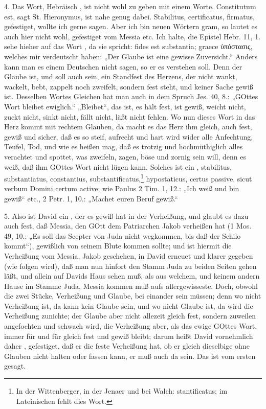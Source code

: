 4. Das Wort, Hebräisch , ist nicht wohl zu geben mit einem Worte. Constitutum est, sagt St. Hieronymus, ist nahe genug dabei. Stabilitus, certificatus, firmatus, gefestiget, wollte ich gerne sagen. Aber ich bin neuen Wörtern gram, so lautet es auch hier nicht wohl, gefestiget vom Messia etc. Ich halte, die Epistel Hebr. 11, 1. sehe hieher auf das Wort , da sie spricht: fides est substantia; graece ὑπόστασις, welches mir verdeutscht haben: „Der Glaube ist eine gewisse Zuversicht.“ Anders kann man es einem Deutschen nicht sagen, so er es verstehen soll. Denn der Glaube ist, und soll auch sein, ein Standfest des Herzens, der nicht wankt, wackelt, bebt, zappelt noch zweifelt, sondern fest steht, und keiner Sache gewiß ist. Desselben Wortes Gleichen hat man auch in dem Spruch Jes. 40, 8.: „GOttes Wort bleibet ewiglich.“ „Bleibet“, das ist, es hält fest, ist gewiß, weicht nicht, zuckt nicht, sinkt nicht, fällt nicht, läßt nicht fehlen. Wo nun dieses Wort in das Herz kommt mit rechtem Glauben, da macht es das Herz ihm gleich, auch fest, gewiß und sicher, daß es so steif, aufrecht und hart wird wider alle Anfechtung, Teufel, Tod, und wie es heißen mag, daß es trotzig und hochmüthiglich alles verachtet und spottet, was zweifeln, zagen, böse und zornig sein will, denn es weiß, daß ihm GOttes Wort nicht lügen kann. Solches ist ein , stabilitus, substantiatus, constantius, substantificatus,\footnote{In der Wittenberger, in der Jenaer und bei Walch: stantificatus; im Lateinischen fehlt dies Wort.} hypostaticus, certus passive. sicut verbum Domini certum active; wie Paulus 2 Tim. 1, 12.: „Ich weiß und bin gewiß“ etc., 2 Petr. 1, 10.: „Machet euren Beruf gewiß.“

5. Also ist David ein , der es gewiß hat in der Verheißung, und glaubt es dazu auch fest, daß Messia, den GOtt dem Patriarchen Jakob verheißen hat (1 Mos. 49, 10.: „Es soll das Scepter von Juda nicht wegkommen, bis daß der Schilo kommt“), gewißlich von seinem Blute kommen sollte; und ist hiermit die Verheißung vom Messia, Jakob geschehen, in David erneuet und klarer gegeben (wie folgen wird), daß man nun hinfort den Stamm Juda zu beiden Seiten gehen läßt, und allein auf Davids Haus sehen muß, als aus welchem, und keinem andern Hause im Stamme Juda, Messia kommen muß aufs allergewisseste. Doch, obwohl die zwei Stücke, Verheißung und Glaube, bei einander sein müssen; denn wo nicht Verheißung ist, da kann kein Glaube sein, und wo nicht Glaube ist, da wird die Verheißung zunichte; der Glaube aber nicht allezeit gleich fest, sondern zuweilen angefochten und schwach wird, die Verheißung aber, als das ewige GOttes Wort, immer für und für gleich fest und gewiß bleibt; darum heißt David vornehmlich daher , gefestiget, daß er die feste Verheißung hat, ob er gleich dieselbige ohne Glauben nicht halten oder fassen kann, er muß auch da sein. Das ist vom ersten gesagt.

